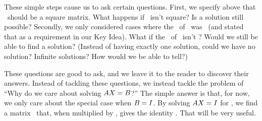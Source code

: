 These simple steps cause us to ask certain questions. First, we specify above that \tta\ should be a square matrix. What happens if \tta\ isn't square? Is a solution still possible? Secondly, we only considered cases where the \rref\ of \tta\ was \tti\ (and stated that as a requirement in our Key Idea). What if the \rref\ of \tta\ isn't \tti? Would we still be able to find a solution? (Instead of having exactly one solution, could we have no solution? Infinite solutions? How would we be able to tell?)


These questions are good to ask, and we leave it to the reader to discover their answers. Instead of tackling these questions, we instead tackle the problem of ``Why do we care about solving $AX=B$?'' The simple answer is that, for now, we only care about the special case when $B=I$. By solving $AX = I$ for \ttx, we find a matrix \ttx\ that, when multiplied by \tta, gives the identity \tti. That will be very useful.\\



